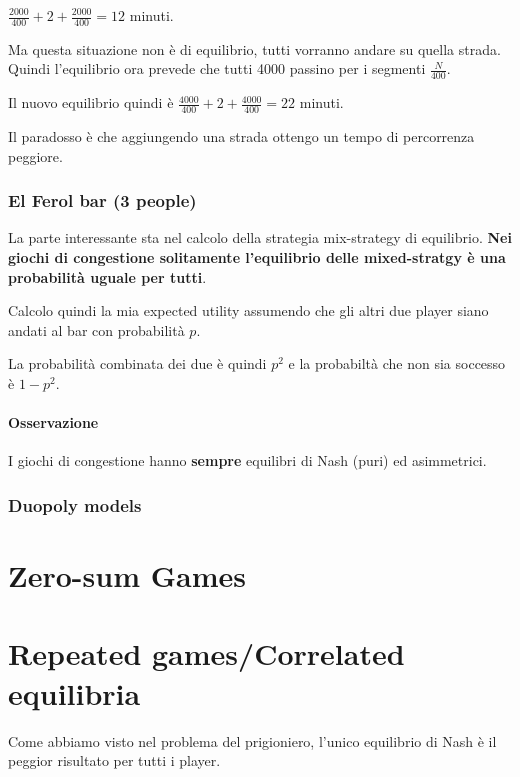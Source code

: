 \documentclass[10pt,a4paper]{report}
\begin{document}
        $\frac{2000}{400} + 2 + \frac{2000}{400} = 12$ minuti.

        Ma questa situazione non è di equilibrio, tutti vorranno andare su quella strada. Quindi l'equilibrio ora prevede che tutti 4000 passino per i segmenti $\frac{N}{400}$.

        Il nuovo equilibrio quindi è $\frac{4000}{400} + 2 + \frac{4000}{400} = 22$ minuti.

        Il paradosso è che aggiungendo una strada ottengo un tempo di percorrenza peggiore.

        \subsection{El Ferol bar (3 people)}

        La parte interessante sta nel calcolo della strategia mix-strategy di equilibrio. \textbf{Nei giochi di congestione solitamente l'equilibrio delle mixed-stratgy è una probabilità uguale per tutti}.

        Calcolo quindi la mia expected utility assumendo che gli altri due player siano andati al bar con probabilità $p$.
        
        La probabilità combinata dei due è quindi $p^2$ e la probabiltà che non sia soccesso è $1-p^2$.

        \subsubsection{Osservazione}
        I giochi di congestione hanno \textbf{sempre} equilibri di Nash (puri) ed asimmetrici.

        \subsection{Duopoly models}
        
        \chapter{Zero-sum Games}

        \chapter{Repeated games/Correlated equilibria}
        
        Come abbiamo visto nel problema del prigioniero, l'unico equilibrio di Nash è il peggior risultato per tutti i player.
\end{document}

